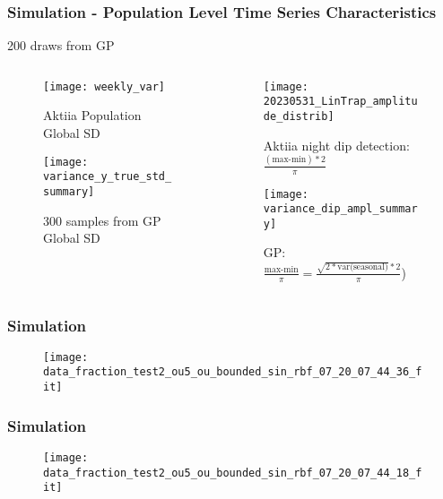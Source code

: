 \documentclass[
	8pt, %
]{beamer}
\begin{document}
\begin{frame}
	\frametitle{Simulation - Population Level Time Series Characteristics}
	200 draws from GP

			\begin{columns}[c] %
		\begin{column}{0.45\textwidth} %
				\begin{figure}
					\texttt{[image: weekly\_var]}
					\caption{Aktiia Population Global SD}

				\end{figure}

			\begin{figure}
					\texttt{[image: variance\_y\_true\_std\_summary]}
					\caption{300 samples from GP Global SD}
			\end{figure}
		\end{column}
		\begin{column}{0.5\textwidth} %
				\begin{figure}
					\texttt{[image: 20230531\_LinTrap\_amplitude\_distrib]}
					\caption{Aktiia night dip detection: $\frac{(\text{max-min})*2}{\pi}$}
				\end{figure}

			\begin{figure}
					\texttt{[image: variance\_dip\_ampl\_summary]}
					\caption{GP: $\frac{\text{max-min}}{\pi} = \frac{\sqrt {2* \text{var(seasonal)}} * 2}{\pi}$)}
			\end{figure}


		\end{column}
	\end{columns}

\end{frame}


\begin{frame}
	\frametitle{Simulation}


	\begin{figure}
			\texttt{[image: data\_fraction\_test2\_ou5\_ou\_bounded\_sin\_rbf\_07\_20\_07\_44\_36\_fit]}
	\end{figure}

\end{frame}



\begin{frame}
	\frametitle{Simulation}

	\begin{figure}
			\texttt{[image: data\_fraction\_test2\_ou5\_ou\_bounded\_sin\_rbf\_07\_20\_07\_44\_18\_fit]}
	\end{figure}

\end{frame}
\end{document}
